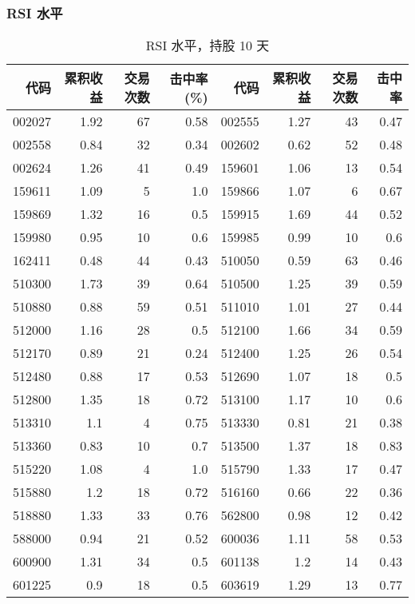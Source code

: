 \subsubsection*{RSI 水平}
\begin{table}
    \centering
    \caption{RSI 水平，持股 10 天}
    \begin{tabular}{rrrrrrrr}
        \hline
        代码     & 累积收益 & 交易次数 & 击中率(\%) & 代码     & 累积收益 & 交易次数 & 击中率  \\
        \hline
        002027 & 1.92 & 67   & 0.58    & 002555 & 1.27 & 43   & 0.47 \\
        002558 & 0.84 & 32   & 0.34    & 002602 & 0.62 & 52   & 0.48 \\
        002624 & 1.26 & 41   & 0.49    & 159601 & 1.06 & 13   & 0.54 \\
        159611 & 1.09 & 5    & 1.0     & 159866 & 1.07 & 6    & 0.67 \\
        159869 & 1.32 & 16   & 0.5     & 159915 & 1.69 & 44   & 0.52 \\
        159980 & 0.95 & 10   & 0.6     & 159985 & 0.99 & 10   & 0.6  \\
        162411 & 0.48 & 44   & 0.43    & 510050 & 0.59 & 63   & 0.46 \\
        510300 & 1.73 & 39   & 0.64    & 510500 & 1.25 & 39   & 0.59 \\
        510880 & 0.88 & 59   & 0.51    & 511010 & 1.01 & 27   & 0.44 \\
        512000 & 1.16 & 28   & 0.5     & 512100 & 1.66 & 34   & 0.59 \\
        512170 & 0.89 & 21   & 0.24    & 512400 & 1.25 & 26   & 0.54 \\
        512480 & 0.88 & 17   & 0.53    & 512690 & 1.07 & 18   & 0.5  \\
        512800 & 1.35 & 18   & 0.72    & 513100 & 1.17 & 10   & 0.6  \\
        513310 & 1.1  & 4    & 0.75    & 513330 & 0.81 & 21   & 0.38 \\
        513360 & 0.83 & 10   & 0.7     & 513500 & 1.37 & 18   & 0.83 \\
        515220 & 1.08 & 4    & 1.0     & 515790 & 1.33 & 17   & 0.47 \\
        515880 & 1.2  & 18   & 0.72    & 516160 & 0.66 & 22   & 0.36 \\
        518880 & 1.33 & 33   & 0.76    & 562800 & 0.98 & 12   & 0.42 \\
        588000 & 0.94 & 21   & 0.52    & 600036 & 1.11 & 58   & 0.53 \\
        600900 & 1.31 & 34   & 0.5     & 601138 & 1.2  & 14   & 0.43 \\
        601225 & 0.9  & 18   & 0.5     & 603619 & 1.29 & 13   & 0.77 \\
        \hline
    \end{tabular}
\end{table}